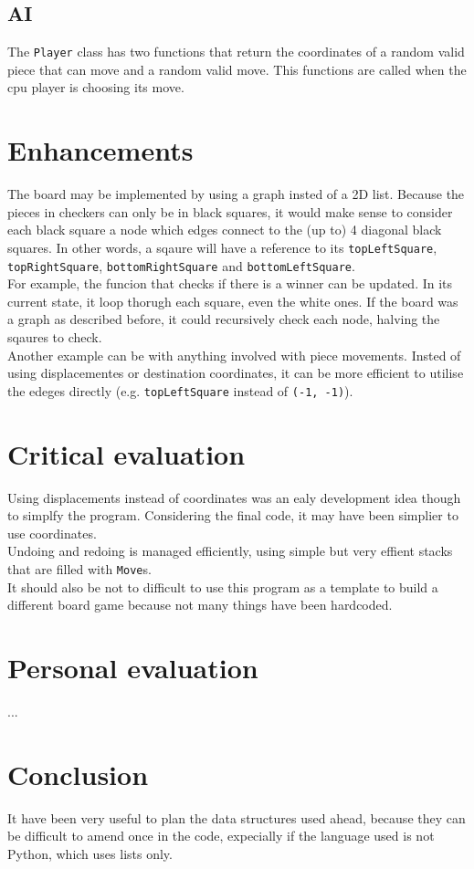 \documentclass[10pt, a4paper]{article}
\begin{document}
	\subsection{AI}
	The \texttt{Player} class has two functions that return the coordinates of a random valid piece that can move and a random valid move. This functions are called when the cpu player is choosing its move.\\
	
	\section{Enhancements}
	The board may be implemented by using a graph insted of a 2D list. Because the pieces in checkers can only be in black squares, it would make sense to consider each black square a node which edges connect to the (up to) 4 diagonal black squares. In other words, a sqaure will have a reference to its \texttt{topLeftSquare}, \texttt{topRightSquare}, \texttt{bottomRightSquare} and \texttt{bottomLeftSquare}.\\
	For example, the funcion that checks if there is a winner can be updated. In its current state, it loop thorugh each square, even the white ones. If the board was a graph as described before, it could recursively check each node, halving the sqaures to check.\\
	Another example can be with anything involved with piece movements. Insted of using displacementes or destination coordinates, it can be more efficient to utilise the edeges directly (e.g. \texttt{topLeftSquare} instead of \texttt{(-1, -1)}).
	
	\section{Critical evaluation}
	Using displacements instead of coordinates was an ealy development idea though to simplfy the program. Considering the final code, it may have been simplier to use coordinates.\\
	Undoing and redoing is managed efficiently, using simple but very effient stacks that are filled with \texttt{Move}s.\\
	It should also be not to difficult to use this program as a template to build a different board game because not many things have been hardcoded.
	
	\section{Personal evaluation}
	...
	
	\section{Conclusion}
	It have been very useful to plan the data structures used ahead, because they can be difficult to amend once in the code, expecially if the language used is not Python, which uses lists only.
		
\end{document}
